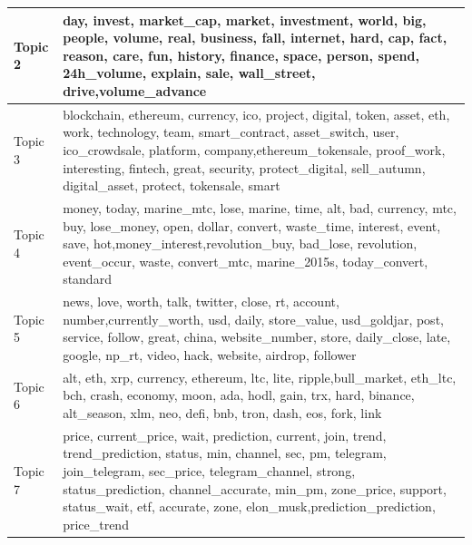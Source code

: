 \documentclass[
]{article}
\begin{document}
\begin{table}
\begin{tabular}[t]{l|l}
\hline
Topic 2 & day,        invest,    market\_cap,        market,    investment,         world,           big,        people,        volume,          real,      business,          fall,      internet,          hard,           cap,          fact,        reason,          care,           fun,       history,       finance,         space,        person,         spend,    24h\_volume,       explain,          sale,   wall\_street,         drive,volume\_advance\\
\hline
Topic 3 & blockchain,          ethereum,          currency,               ico,           project,           digital,             token,             asset,               eth,              work,        technology,              team,    smart\_contract,      asset\_switch,              user,     ico\_crowdsale,          platform,           company,ethereum\_tokensale,        proof\_work,       interesting,           fintech,             great,          security,   protect\_digital,       sell\_autumn,     digital\_asset,           protect,         tokensale,             smart\\
\hline
Topic 4 & money,         today,    marine\_mtc,          lose,        marine,          time,           alt,           bad,      currency,           mtc,           buy,    lose\_money,          open,        dollar,       convert,    waste\_time,      interest,         event,          save,           hot,money\_interest,revolution\_buy,      bad\_lose,    revolution,   event\_occur,         waste,   convert\_mtc,  marine\_2015s, today\_convert,      standard\\
\hline
Topic 5 & news,           love,          worth,           talk,        twitter,          close,             rt,        account,         number,currently\_worth,            usd,          daily,    store\_value,    usd\_goldjar,           post,        service,         follow,          great,          china, website\_number,          store,    daily\_close,           late,         google,          np\_rt,          video,           hack,        website,        airdrop,       follower\\
\hline
Topic 6 & alt,        eth,        xrp,   currency,   ethereum,        ltc,       lite,     ripple,bull\_market,    eth\_ltc,        bch,      crash,    economy,       moon,        ada,       hodl,       gain,        trx,       hard,    binance, alt\_season,        xlm,        neo,       defi,        bnb,       tron,       dash,        eos,       fork,       link\\
\hline
Topic 7 & price,        current\_price,                 wait,           prediction,              current,                 join,                trend,     trend\_prediction,               status,                  min,              channel,                  sec,                   pm,             telegram,        join\_telegram,            sec\_price,     telegram\_channel,               strong,    status\_prediction,     channel\_accurate,               min\_pm,           zone\_price,              support,          status\_wait,                  etf,             accurate,                 zone,            elon\_musk,prediction\_prediction,          price\_trend\\

\end{tabular}
\end{table}
\end{document}
